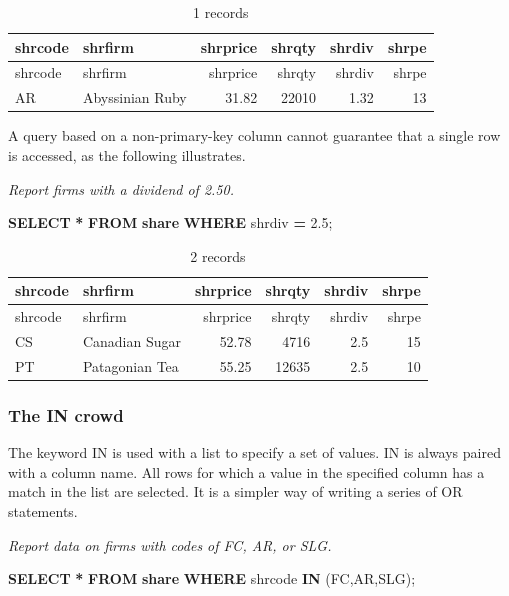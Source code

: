 \documentclass[
]{article}
\newenvironment{Shaded}{\begin{snugshade}}{\end{snugshade}}
\newcommand{\FloatTok}[1]{\textcolor[rgb]{0.00,0.00,0.81}{#1}}
\newcommand{\KeywordTok}[1]{\textcolor[rgb]{0.13,0.29,0.53}{\textbf{#1}}}
\newcommand{\NormalTok}[1]{#1}
\newcommand{\OperatorTok}[1]{\textcolor[rgb]{0.81,0.36,0.00}{\textbf{#1}}}
\newcommand{\StringTok}[1]{\textcolor[rgb]{0.31,0.60,0.02}{#1}}
\begin{document}
\begin{longtable}[]{@{}llrrrr@{}}
\caption{1 records}\tabularnewline
\toprule()
shrcode & shrfirm & shrprice & shrqty & shrdiv & shrpe \\
\midrule()
\endfirsthead
\toprule()
shrcode & shrfirm & shrprice & shrqty & shrdiv & shrpe \\
\midrule()
\endhead
AR & Abyssinian Ruby & 31.82 & 22010 & 1.32 & 13 \\
\bottomrule()
\end{longtable}

A query based on a non-primary-key column cannot guarantee that a single
row is accessed, as the following illustrates.

\emph{Report firms with a dividend of 2.50.}

\begin{Shaded}
\begin{Highlighting}[]
\KeywordTok{SELECT} \OperatorTok{*} \KeywordTok{FROM} \KeywordTok{share} \KeywordTok{WHERE}\NormalTok{ shrdiv }\OperatorTok{=} \FloatTok{2.5}\NormalTok{;}
\end{Highlighting}
\end{Shaded}

\begin{longtable}[]{@{}llrrrr@{}}
\caption{2 records}\tabularnewline
\toprule()
shrcode & shrfirm & shrprice & shrqty & shrdiv & shrpe \\
\midrule()
\endfirsthead
\toprule()
shrcode & shrfirm & shrprice & shrqty & shrdiv & shrpe \\
\midrule()
\endhead
CS & Canadian Sugar & 52.78 & 4716 & 2.5 & 15 \\
PT & Patagonian Tea & 55.25 & 12635 & 2.5 & 10 \\
\bottomrule()
\end{longtable}

\hypertarget{the-in-crowd}{%
\subsubsection{The IN crowd}\label{the-in-crowd}}

The keyword IN is used with a list to specify a set of values. IN is
always paired with a column name. All rows for which a value in the
specified column has a match in the list are selected. It is a simpler
way of writing a series of OR statements.

\emph{Report data on firms with codes of FC, AR, or SLG.}

\begin{Shaded}
\begin{Highlighting}[]
\KeywordTok{SELECT} \OperatorTok{*} \KeywordTok{FROM} \KeywordTok{share} \KeywordTok{WHERE}\NormalTok{ shrcode }\KeywordTok{IN}\NormalTok{ (}\StringTok{\textquotesingle{}FC\textquotesingle{}}\NormalTok{,}\StringTok{\textquotesingle{}AR\textquotesingle{}}\NormalTok{,}\StringTok{\textquotesingle{}SLG\textquotesingle{}}\NormalTok{);}
\end{Highlighting}
\end{Shaded}
\end{document}
